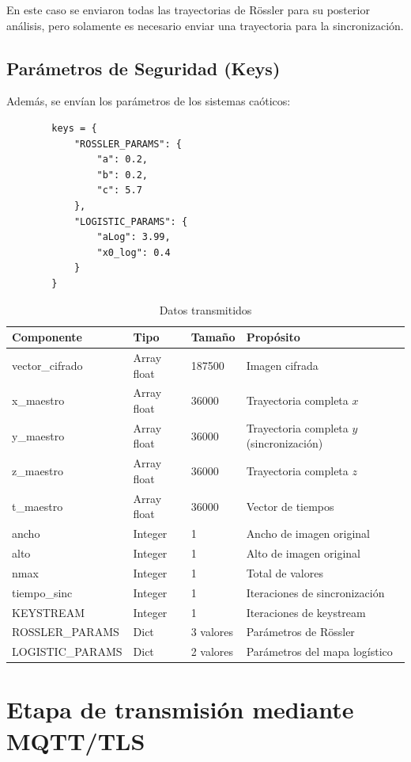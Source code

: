 \documentclass[12pt,a4paper]{article}
\begin{document}
	En este caso se enviaron todas las trayectorias de Rössler para su posterior análisis, pero solamente es necesario enviar una trayectoria para la sincronización.
	
	\subsection{Parámetros de Seguridad (Keys)}
	
	Además, se envían los parámetros de los sistemas caóticos:
	
	\begin{lstlisting}
		keys = {
			"ROSSLER_PARAMS": {
				"a": 0.2,
				"b": 0.2,
				"c": 5.7
			},
			"LOGISTIC_PARAMS": {
				"aLog": 3.99,
				"x0_log": 0.4
			}
		}
	\end{lstlisting}
	
	\begin{table}[H]
		\centering
		\caption{Datos transmitidos}
		\label{tab:payload}
		\small
		\begin{tabular}{@{}llll@{}}
			\toprule
			\textbf{Componente} & \textbf{Tipo} & \textbf{Tamaño} & \textbf{Propósito} \\ \midrule
			vector\_cifrado & Array float & 187500 & Imagen cifrada \\
			x\_maestro & Array float & 36000 & Trayectoria completa $x$ \\
			y\_maestro & Array float & 36000 & Trayectoria completa $y$ (sincronización) \\
			z\_maestro & Array float & 36000 & Trayectoria completa $z$ \\
			t\_maestro & Array float & 36000 & Vector de tiempos \\
			ancho & Integer & 1 & Ancho de imagen original \\
			alto & Integer & 1 & Alto de imagen original \\
			nmax & Integer & 1 & Total de valores \\
			tiempo\_sinc & Integer & 1 & Iteraciones de sincronización \\
			KEYSTREAM & Integer & 1 & Iteraciones de keystream \\
			ROSSLER\_PARAMS & Dict & 3 valores & Parámetros de Rössler \\
			LOGISTIC\_PARAMS & Dict & 2 valores & Parámetros del mapa logístico \\ \bottomrule
		\end{tabular}
	\end{table}
	
	\section{Etapa de transmisión mediante MQTT/TLS}
	
\end{document}
